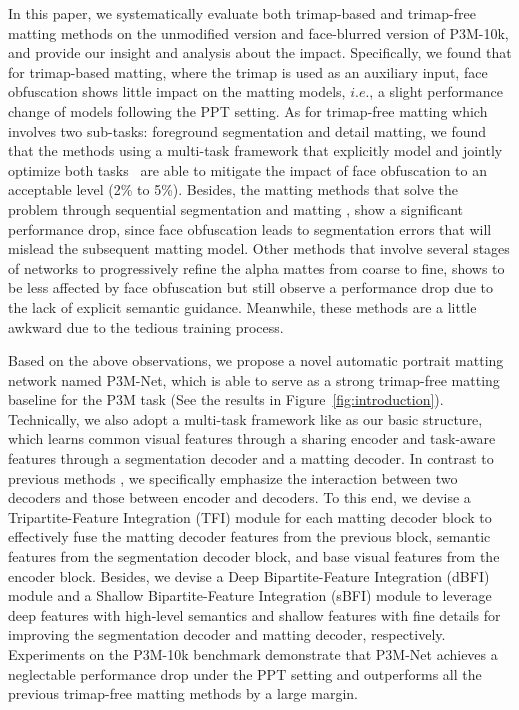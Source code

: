 \documentclass[sigconf]{acmart}
\begin{document}
In this paper, we systematically evaluate both trimap-based and trimap-free matting methods on the unmodified version and face-blurred version of P3M-10k, and provide our insight and analysis about the impact. Specifically, we found that for trimap-based matting, where the trimap is used as an auxiliary input, face obfuscation shows little impact on the matting models, $i.e.$, a slight performance change of models following the PPT setting. As for trimap-free matting which involves two sub-tasks: foreground segmentation and detail matting, we found that the methods using a multi-task framework that explicitly model and jointly optimize both tasks~\cite{gfm,hatt} are able to mitigate the impact of face obfuscation to an acceptable level (2\% to 5\%). Besides, the matting methods that solve the problem through sequential segmentation and matting \cite{shm,dapm}, show a significant performance drop, since face obfuscation leads to segmentation errors that will mislead the subsequent matting model. Other methods that involve several stages of networks to progressively refine the alpha mattes from coarse to fine, shows to be less affected by face obfuscation but still observe a performance drop due to the lack of explicit semantic guidance. Meanwhile, these methods are a little awkward due to the tedious training process.

Based on the above observations, we propose a novel automatic portrait matting network named P3M-Net, which is able to serve as a strong trimap-free matting baseline for the P3M task (See the results in Figure~\ref{fig:introduction}). Technically, we also adopt a multi-task framework like \cite{gfm,hatt} as our basic structure, which learns common visual features through a sharing encoder and task-aware features through a segmentation decoder and a matting decoder. In contrast to previous methods \cite{gfm,hatt}, we specifically emphasize the interaction between two decoders and those between encoder and decoders. To this end, we 
devise a Tripartite-Feature Integration (TFI) module for each matting decoder block to effectively fuse the matting decoder features from the previous block, semantic features from the segmentation decoder block, and base visual features from the encoder block. Besides, we devise a Deep Bipartite-Feature Integration (dBFI) module and a Shallow Bipartite-Feature Integration (sBFI) module to leverage deep features with high-level semantics and shallow features with fine details for improving the segmentation decoder and matting decoder, respectively. Experiments on the P3M-10k benchmark demonstrate that P3M-Net achieves a neglectable performance drop under the PPT setting and outperforms all the previous trimap-free matting methods by a large margin. 
\end{document}

